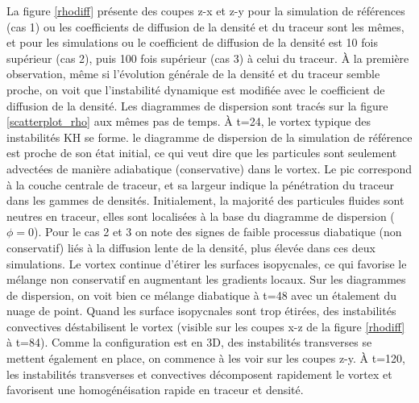\documentclass[a4paper,12pt]{article}
\begin{document}
    La figure \ref{rhodiff} présente des coupes z-x et z-y pour la simulation de références (cas 1) ou les coefficients de diffusion de la densité et du traceur sont les mêmes, et pour les simulations ou le coefficient de diffusion de la densité est 10 fois supérieur (cas 2), puis 100 fois supérieur (cas 3) à celui du traceur. À la première observation, même si l'évolution générale de la densité et du traceur semble proche, on voit que l'instabilité dynamique est modifiée avec le coefficient de diffusion de la densité. Les diagrammes de dispersion sont tracés sur la figure \ref{scatterplot_rho} aux mêmes pas de temps. 
    À t=24, le vortex typique des instabilités KH se forme. le diagramme de dispersion de la simulation de référence est proche de son état initial, ce qui veut dire que les particules sont seulement advectées de manière adiabatique (conservative) dans le vortex. Le pic correspond à la couche centrale de traceur, et sa largeur indique la pénétration du traceur dans les gammes de densités. Initialement, la majorité des particules fluides sont neutres en traceur, elles sont localisées à la base du diagramme de dispersion ($\phi=0$). Pour le cas 2 et 3 on note des signes de faible processus diabatique (non conservatif) liés à la diffusion lente de la densité, plus élevée dans ces deux simulations. 
    Le vortex continue d'étirer les surfaces isopycnales, ce qui favorise le mélange non conservatif en augmentant les gradients locaux. Sur les diagrammes de dispersion, on voit bien ce mélange diabatique à t=48 avec un étalement du nuage de point. 
    Quand les surface isopycnales sont trop étirées, des instabilités convectives déstabilisent le vortex (visible sur les coupes x-z de la figure \ref{rhodiff} à t=84). Comme la configuration est en 3D, des instabilités transverses se mettent également en place, on commence à les voir sur les coupes z-y. 
    À t=120, les instabilités transverses et convectives décomposent rapidement le vortex et favorisent une homogénéisation rapide en traceur et densité. 
\end{document}
